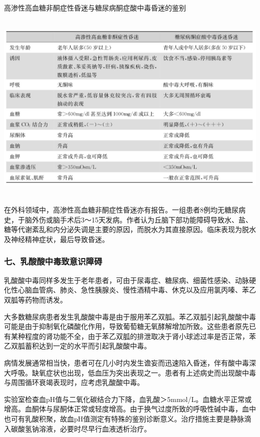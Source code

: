 \begin{table}[htbp]
\centering
\caption{高渗性高血糖非酮症性昏迷与糖尿病酮症酸中毒昏迷的鉴别}
\label{tab49-2}
\includegraphics[width=5.94792in,height=3.66667in]{./images/Image00307.jpg}
\end{table}

在外科领域中，高渗性高血糖非酮症性昏迷亦有报告。一组患者8例均无糖尿病史，于脑外伤或脑手术后3～15天发病。作者认为丘脑下部功能障碍导致水、盐、糖等代谢紊乱和内分泌失调是主要的原因，而脱水为其直接原因。临床表现为脱水及神经精神症状，最后导致昏迷。

\subsubsection{七、乳酸酸中毒致意识障碍}

乳酸酸中毒同样多发生于老年患者，可由于尿毒症、糖尿病、细菌性感染、动脉硬化性心脑血管病、肺炎、急性胰腺炎、慢性酒精中毒、休克以及应用氯丙嗪、苯乙双胍等药物而诱发。

大多数糖尿病患者发生乳酸酸中毒是由于服用苯乙双胍。苯乙双胍引起乳酸酸中毒可能是由于抑制氧化磷酸化作用，导致葡萄糖无氧酵解增加所致。这些患者原先已有某种程度的肾功能不全，由于苯乙双胍的排泄取决于肾小球滤过率是否正常，苯乙双胍蓄积达到一定的水平而引起乳酸酸中毒。

病情发展通常相当快，患者可在几小时内发生谵妄而迅速陷入昏迷，伴有酸中毒深大呼吸。缺氧症状也出现，低血压为突出表现之一。患者有上述病史而出现酸中毒与周围循环衰竭表现时，应考虑乳酸酸中毒。

实验室检查血pH值与二氧化碳结合力下降，血乳酸＞5mmol/L。血糖水平正常或增高。血酮体与尿酮体正常或轻度增高。由于换气过度所致的呼吸性碱中毒，血中也可有乳酸积聚，故血pH值测定有特殊的鉴别诊断意义。治疗措施主要是静脉滴入碳酸氢钠溶液，必要时尽早行血液透析治疗。

